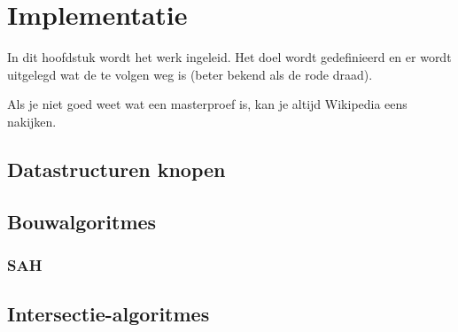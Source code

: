\chapter{Implementatie}
\label{hoofdstuk:implementatie}
In dit hoofdstuk wordt het werk ingeleid. Het doel wordt gedefinieerd en er
wordt uitgelegd wat de te volgen weg is (beter bekend als de rode draad).

Als je niet goed weet wat een masterproef is, kan je altijd
Wikipedia eens nakijken.

\section{Datastructuren knopen}
\section{Bouwalgoritmes}
    \subsection{SAH}
\section{Intersectie-algoritmes}

%


